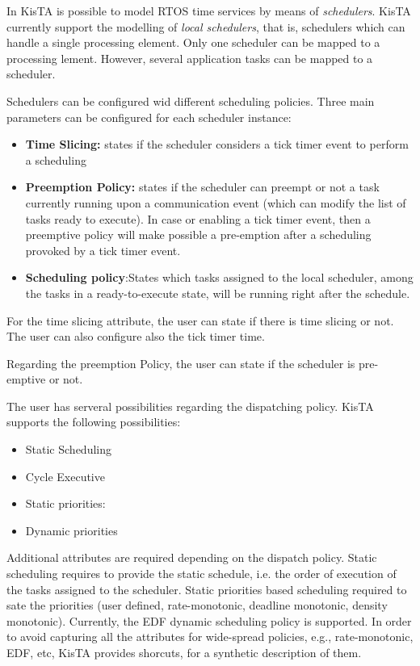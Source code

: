 
In KisTA is possible to model RTOS time services by means of \emph{schedulers}.
%
%
KisTA currently support the modelling of \emph{local schedulers}, that is,
schedulers which can handle a single processing element.
Only one scheduler can be mapped to a processing lement.
However, several application tasks can be mapped to a scheduler.

Schedulers can be configured wid different scheduling policies.
Three main parameters can be configured for each scheduler instance:

\begin{itemize}
\item \textbf{Time Slicing:} states if the scheduler considers a tick timer event to perform a scheduling
\item \textbf{Preemption Policy:} states if the scheduler can preempt or not a task currently running upon a
communication event (which can modify the list of tasks ready to execute). 
In case or enabling a tick timer event, then a preemptive policy will make possible a pre-emption
after a scheduling provoked by a tick timer event.
\item \textbf{Scheduling policy}:States which tasks assigned to the local scheduler, among the tasks
in a ready-to-execute state, will be running right after the schedule.
\end{itemize}

For the time slicing attribute, the user can state if there is time slicing or not. 
The user can also configure also the tick timer time.

Regarding the preemption Policy, the user can state if the scheduler is pre-emptive or not.

The user has serveral possibilities regarding the dispatching policy.
KisTA supports the following possibilities:
\begin{itemize}
\item Static Scheduling
\item Cycle Executive
\item Static priorities: 
\item Dynamic priorities
\end{itemize}

Additional attributes are required depending on the dispatch policy.
Static scheduling requires to provide the static schedule, i.e. the order of execution of
the tasks assigned to the scheduler.
Static priorities based scheduling required to sate the priorities (user defined, rate-monotonic, deadline monotonic, density monotonic).
Currently, the EDF dynamic scheduling policy is supported.
%
In order to avoid capturing all the attributes for wide-spread policies,
e.g., rate-monotonic, EDF, etc, KisTA provides shorcuts, for a synthetic description of them.

